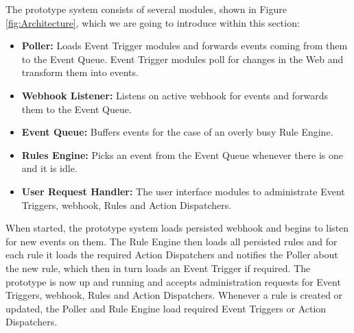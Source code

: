 The prototype system consists of several modules, shown in Figure \ref{fig:Architecture}, which we are going to introduce within this section:
\begin{itemize}
	\item \textbf{\textrm{Poller}:} Loads \textrm{Event Trigger} modules and forwards events coming from them to the \textrm{Event Queue}. \textrm{Event Trigger} modules poll for changes in the Web and transform them into events. 
	\item \textbf{\textrm{Webhook Listener}:} Listens on active \textrm{\gls{webhook}} for events and forwards them to the \textrm{Event Queue}.
	\item \textbf{\textrm{Event Queue}:} Buffers events for the case of an overly busy \textrm{Rule Engine}. 
	\item \textbf{\textrm{Rules Engine}:} Picks an event from the \textrm{Event Queue} whenever there is one and it is idle. 
	\item \textbf{\textrm{User Request Handler}:} The user interface modules to administrate \textrm{Event Triggers}, \textrm{\gls{webhook}}, \textrm{Rules} and \textrm{Action Dispatchers}.
\end{itemize}

When started, the prototype system loads persisted \textrm{\gls{webhook}} and begins to listen for new events on them.
The \textrm{Rule Engine} then loads all persisted rules and for each rule it loads the required \textrm{Action Dispatchers} and notifies the \textrm{Poller} about the new rule, which then in turn loads an \textrm{Event Trigger} if required.
The prototype is now up and running and accepts administration requests for \textrm{Event Triggers}, \textrm{\gls{webhook}}, \textrm{Rules} and \textrm{Action Dispatchers}.
Whenever a rule is created or updated, the \textrm{Poller} and \textrm{Rule Engine} load required \textrm{Event Triggers} or \textrm{Action Dispatchers}.

